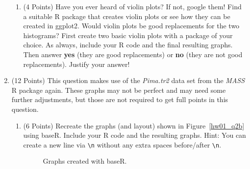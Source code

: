 \documentclass[12pt,letterpaper,final]{article}
\begin{document}
\begin{enumerate}
\begin{enumerate}
\item (4 Points) Have you ever heard of violin plots? If not, google them!
Find a suitable R package that creates violin plots or see how they can be
created in ggplot2.
Would violin plots be good replacements for the two histograms? 
First create two basic violin plots with a package of your choice.
As always, include your R code and the final resulting graphs.
Then answer {\bf yes} (they are good replacements) or {\bf no}
(they are not good replacements). Justify your answer!


\end{enumerate}


\newpage


\item (12 Points)
This question makes use of the {\it Pima.tr2} data set 
from the {\it MASS} R package again.
These graphs may not be perfect and may need some
further adjustments, but those are not required to get full points in this question.


\begin{enumerate}
\item (6 Points) Recreate the graphs (and layout) shown in Figure~\ref{hw01_q2b} using baseR.
Include your R code and the resulting graphs.
Hint: You can create a new line via \verb|\n| without any extra spaces before/after \verb|\n|.



\begin{figure}[ht]
\caption{\label{hw01_q2a}
Graphs created with baseR.
}
\end{figure}



\end{enumerate}
\end{enumerate}
\end{document}

